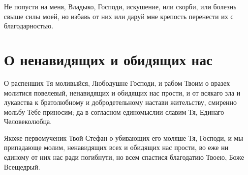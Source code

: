

\label{_content_molitvi-vskorbyah}

 


{\centering{}\par}

\begin{mymulticols}

Не попусти на меня, Владыко, Господи, искушение, или скорби, или болезнь свыше силы моей, но избавь от них или даруй мне крепость перенести их с благодарностью.

\end{mymulticols}

\section{О ненавидящих и обидящих нас}\begin{mymulticols}
 

О распенших Тя моливыйся, Любодушне Господи, и рабом Твоим о вразех молитися повелевый, ненавидящих и обидящих нас прости, и от всякаго зла и лукавства к братолюбному и добродетельному настави жительству, смиренно мольбу Тебе приносим; да в согласном единомыслии славим Тя, Единаго Человеколюбца.

Якоже первомученик Твой Стефан о убивающих его моляше Тя, Господи, и мы припадающе молим, ненавидящих всех и обидящих нас прости, во еже ни единому от них нас ради погибнути, но всем спастися благодатию Твоею, Боже Всещедрый.

\end{mymulticols}

